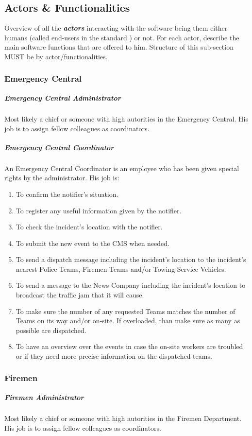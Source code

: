 \subsection{Actors \& Functionalities}
Overview of all the \textbf{\emph{\glspl{actor}}} interacting with the software
being them either humans (called end-users in the standard
\cite{IEEE-2001-userdocumentation}) or not. For each actor, describe the main
software functions that are offered to him. Structure of this sub-section MUST
be by actor/functionalities.



\subsubsection{Emergency Central}
\subparagraph{Emergency Central Administrator}
Most likely a chief or someone with high autorities in the Emergency Central. His
job is to assign fellow colleagues as coordinators.

\subparagraph{Emergency Central Coordinator}
An Emergency Central Coordinator is an employee who has been given special rights
by the administrator. His job is:

\begin{enumerate}
\item To confirm the notifier's situation.
\item To register any useful information given by the notifier.
\item To check the incident's location with the notifier.
\item To submit the new event to the CMS when needed.
\item To send a dispatch message including the incident's location to the
incident's nearest Police Teams, Firemen Teams and/or Towing Service Vehicles.
\item To send a message to the News Company including the incident's location to
broadcast the traffic jam that it will cause.
\item To make sure the number of any requested Teams matches the number of Teams
on its way and/or on-site. If overloaded, than make sure as many as possible are
dispatched.
\item To have an overview over the events in case the on-site workers are
troubled or if they need more precise information on the dispatched teams.
\end{enumerate}



\subsubsection{Firemen}
\subparagraph{Firemen Administrator}
Most likely a chief or someone with high autorities in the Firemen Department.
His job is to assign fellow colleagues as coordinators.

